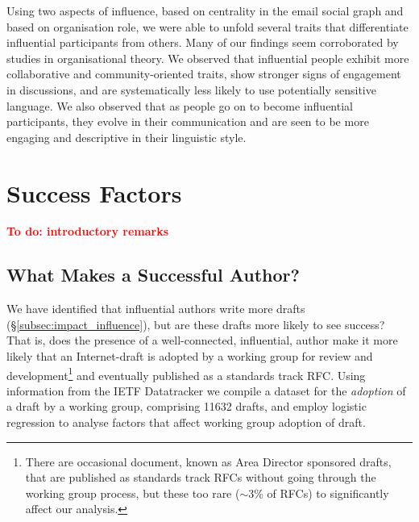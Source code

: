 \documentclass[twocolumn,10pt]{article}
\newcommand{\todo}[1]{\textbf{\textcolor{red}{To do: #1}}}
\newcommand{\pb}[1]{\vspace{0.75ex}\noindent{\textbf{#1}}}
\begin{document}
\pb{Summary:}
Using two aspects of influence, based on centrality in the email social
graph and based on organisation role, we were able to unfold several
traits that differentiate influential participants from others. Many
of our findings seem corroborated by studies in organisational theory.
We observed that influential people exhibit more collaborative and
community-oriented traits, show stronger signs of engagement in
discussions, and are systematically less likely to use potentially
sensitive language.
We also observed that as people go on to become influential participants,
they evolve in their communication and are seen to be more engaging and
descriptive in their linguistic style. 


\section{Success Factors}
\label{sec:success-factors}

\todo{introductory remarks}

\subsection{What Makes a Successful Author?}
\label{sec:success-factors:authors}


We have identified that influential authors write more drafts
(\S\ref{subsec:impact_influence}), but are these drafts more likely to
see success?  That is, does the presence of a well-connected, influential,
author make it more likely that an Internet-draft is adopted by a working
group for review and development\footnote{There are occasional document,
known as Area Director sponsored drafts, that are published as standards
track RFCs without going through the working group process, but these too
rare ($\sim$3\% of RFCs) to significantly affect our analysis.} and
eventually published as a standards track RFC.  Using information from the
IETF Datatracker we compile a dataset for the \emph{adoption} of a draft by
a working group, comprising 11632 drafts, and employ logistic regression to
analyse factors that affect working group adoption of draft.
\end{document}
